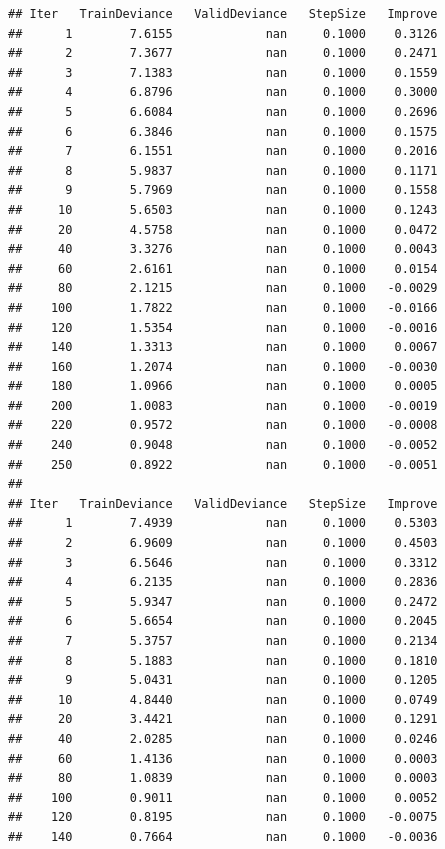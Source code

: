 \documentclass[
]{book}
\begin{document}
\begin{verbatim}
## Iter   TrainDeviance   ValidDeviance   StepSize   Improve
##      1        7.6155             nan     0.1000    0.3126
##      2        7.3677             nan     0.1000    0.2471
##      3        7.1383             nan     0.1000    0.1559
##      4        6.8796             nan     0.1000    0.3000
##      5        6.6084             nan     0.1000    0.2696
##      6        6.3846             nan     0.1000    0.1575
##      7        6.1551             nan     0.1000    0.2016
##      8        5.9837             nan     0.1000    0.1171
##      9        5.7969             nan     0.1000    0.1558
##     10        5.6503             nan     0.1000    0.1243
##     20        4.5758             nan     0.1000    0.0472
##     40        3.3276             nan     0.1000    0.0043
##     60        2.6161             nan     0.1000    0.0154
##     80        2.1215             nan     0.1000   -0.0029
##    100        1.7822             nan     0.1000   -0.0166
##    120        1.5354             nan     0.1000   -0.0016
##    140        1.3313             nan     0.1000    0.0067
##    160        1.2074             nan     0.1000   -0.0030
##    180        1.0966             nan     0.1000    0.0005
##    200        1.0083             nan     0.1000   -0.0019
##    220        0.9572             nan     0.1000   -0.0008
##    240        0.9048             nan     0.1000   -0.0052
##    250        0.8922             nan     0.1000   -0.0051
## 
## Iter   TrainDeviance   ValidDeviance   StepSize   Improve
##      1        7.4939             nan     0.1000    0.5303
##      2        6.9609             nan     0.1000    0.4503
##      3        6.5646             nan     0.1000    0.3312
##      4        6.2135             nan     0.1000    0.2836
##      5        5.9347             nan     0.1000    0.2472
##      6        5.6654             nan     0.1000    0.2045
##      7        5.3757             nan     0.1000    0.2134
##      8        5.1883             nan     0.1000    0.1810
##      9        5.0431             nan     0.1000    0.1205
##     10        4.8440             nan     0.1000    0.0749
##     20        3.4421             nan     0.1000    0.1291
##     40        2.0285             nan     0.1000    0.0246
##     60        1.4136             nan     0.1000    0.0003
##     80        1.0839             nan     0.1000    0.0003
##    100        0.9011             nan     0.1000    0.0052
##    120        0.8195             nan     0.1000   -0.0075
##    140        0.7664             nan     0.1000   -0.0036

\end{verbatim}
\end{document}
